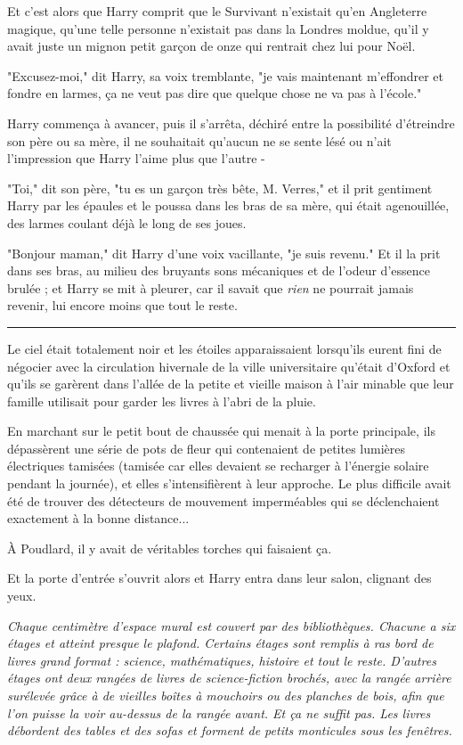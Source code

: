 Et c'est alors que Harry comprit que le Survivant n'existait qu'en Angleterre magique, qu'une telle personne n'existait pas dans la Londres moldue, qu'il y avait juste un mignon petit garçon de onze qui rentrait chez lui pour Noël.

"Excusez-moi," dit Harry, sa voix tremblante, "je vais maintenant m'effondrer et fondre en larmes, ça ne veut pas dire que quelque chose ne va pas à l'école."

Harry commença à avancer, puis il s'arrêta, déchiré entre la possibilité d'étreindre son père ou sa mère, il ne souhaitait qu'aucun ne se sente lésé ou n'ait l'impression que Harry l'aime plus que l'autre -

"Toi," dit son père, "tu es un garçon très bête, M. Verres," et il prit gentiment Harry par les épaules et le poussa dans les bras de sa mère, qui était agenouillée, des larmes coulant déjà le long de ses joues.

"Bonjour maman," dit Harry d'une voix vacillante, "je suis revenu." Et il la prit dans ses bras, au milieu des bruyants sons mécaniques et de l'odeur d'essence brulée ; et Harry se mit à pleurer, car il savait que \emph{rien}  ne pourrait jamais revenir, lui encore moins que tout le reste.
\par\noindent\rule{\textwidth}{0.4pt}
Le ciel était totalement noir et les étoiles apparaissaient lorsqu'ils eurent fini de négocier avec la circulation hivernale de la ville universitaire qu'était d'Oxford et qu'ils se garèrent dans l'allée de la petite et vieille maison à l'air minable que leur famille utilisait pour garder les livres à l'abri de la pluie.

En marchant sur le petit bout de chaussée qui menait à la porte principale, ils dépassèrent une série de pots de fleur qui contenaient de petites lumières électriques tamisées (tamisée car elles devaient se recharger à l'énergie solaire pendant la journée), et elles s'intensifièrent à leur approche. Le plus difficile avait été de trouver des détecteurs de mouvement imperméables qui se déclenchaient exactement à la bonne distance...

À Poudlard, il y avait de véritables torches qui faisaient ça.

Et la porte d'entrée s'ouvrit alors et Harry entra dans leur salon, clignant des yeux.

\emph{Chaque centimètre d'espace mural est couvert par des bibliothèques. Chacune a six étages et atteint presque le plafond. Certains étages sont remplis à ras bord de livres grand format : science, mathématiques, histoire et tout le reste. D'autres étages ont deux rangées de livres de science-fiction brochés, avec la rangée arrière surélevée grâce à de vieilles boîtes à mouchoirs ou des planches de bois, afin que l'on puisse la voir au-dessus de la rangée avant. Et ça ne suffit pas. Les livres débordent des tables et des sofas et forment de petits monticules sous les fenêtres.} 

